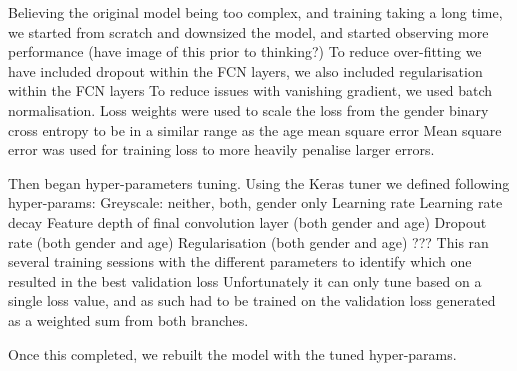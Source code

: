 Believing the original model being too complex, and training taking a long time, we started from scratch and downsized the model, and started observing more performance (have image of this prior to thinking?)
To reduce over-fitting we have included dropout within the FCN layers, we also included regularisation within the FCN layers
To reduce issues with vanishing gradient, we used batch normalisation.
Loss weights were used to scale the loss from the gender binary cross entropy to be in a similar range as the age mean square error
Mean square error was used for training loss to more heavily penalise larger errors.

Then began hyper-parameters tuning.
Using the Keras tuner we defined following hyper-params:
Greyscale: neither, both, gender only
Learning rate
Learning rate decay
Feature depth of final convolution layer (both gender and age)
Dropout rate (both gender and age)
Regularisation (both gender and age)
???
This ran several training sessions with the different parameters to identify which one resulted in the best validation loss
Unfortunately it can only tune based on a single loss value, and as such had to be trained on the validation loss generated as a weighted sum from both branches.

Once this completed, we rebuilt the model with the tuned hyper-params.
